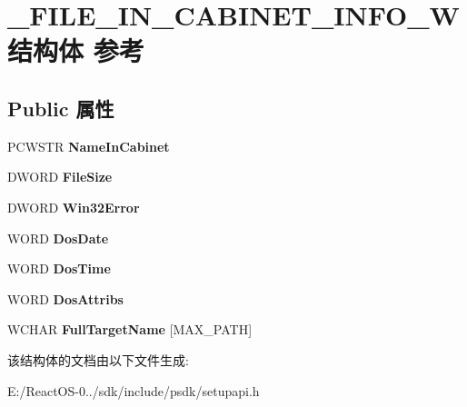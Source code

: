 \hypertarget{struct___f_i_l_e___i_n___c_a_b_i_n_e_t___i_n_f_o___w}{}\section{\+\_\+\+F\+I\+L\+E\+\_\+\+I\+N\+\_\+\+C\+A\+B\+I\+N\+E\+T\+\_\+\+I\+N\+F\+O\+\_\+\+W结构体 参考}
\label{struct___f_i_l_e___i_n___c_a_b_i_n_e_t___i_n_f_o___w}
\subsection*{Public 属性}
\begin{DoxyCompactItemize}
\item 
\mbox{\label{struct___f_i_l_e___i_n___c_a_b_i_n_e_t___i_n_f_o___w_a39512fd3d6c495ecf916c98b06d40486}} 
P\+C\+W\+S\+TR {\bfseries Name\+In\+Cabinet}
\item 
\mbox{\label{struct___f_i_l_e___i_n___c_a_b_i_n_e_t___i_n_f_o___w_acc2ae66cc7eb2980126140ee82b5d243}} 
D\+W\+O\+RD {\bfseries File\+Size}
\item 
\mbox{\label{struct___f_i_l_e___i_n___c_a_b_i_n_e_t___i_n_f_o___w_ac73185dc672ff569028a995b9b2e7a4b}} 
D\+W\+O\+RD {\bfseries Win32\+Error}
\item 
\mbox{\label{struct___f_i_l_e___i_n___c_a_b_i_n_e_t___i_n_f_o___w_ad24964f34cfcf2aa9b319de2fea5fc40}} 
W\+O\+RD {\bfseries Dos\+Date}
\item 
\mbox{\label{struct___f_i_l_e___i_n___c_a_b_i_n_e_t___i_n_f_o___w_a9c0d5e5f9ae7deca2688610c18478644}} 
W\+O\+RD {\bfseries Dos\+Time}
\item 
\mbox{\label{struct___f_i_l_e___i_n___c_a_b_i_n_e_t___i_n_f_o___w_a77c46ce69fd7744be466d172322557ed}} 
W\+O\+RD {\bfseries Dos\+Attribs}
\item 
\mbox{\label{struct___f_i_l_e___i_n___c_a_b_i_n_e_t___i_n_f_o___w_a21e0fd1e083a9eec331e26dad1cb2d95}} 
W\+C\+H\+AR {\bfseries Full\+Target\+Name} \mbox{[}M\+A\+X\+\_\+\+P\+A\+TH\mbox{]}
\end{DoxyCompactItemize}


该结构体的文档由以下文件生成\+:\begin{DoxyCompactItemize}
\item 
E\+:/\+React\+O\+S-\/0../sdk/include/psdk/setupapi.\+h\end{DoxyCompactItemize}
